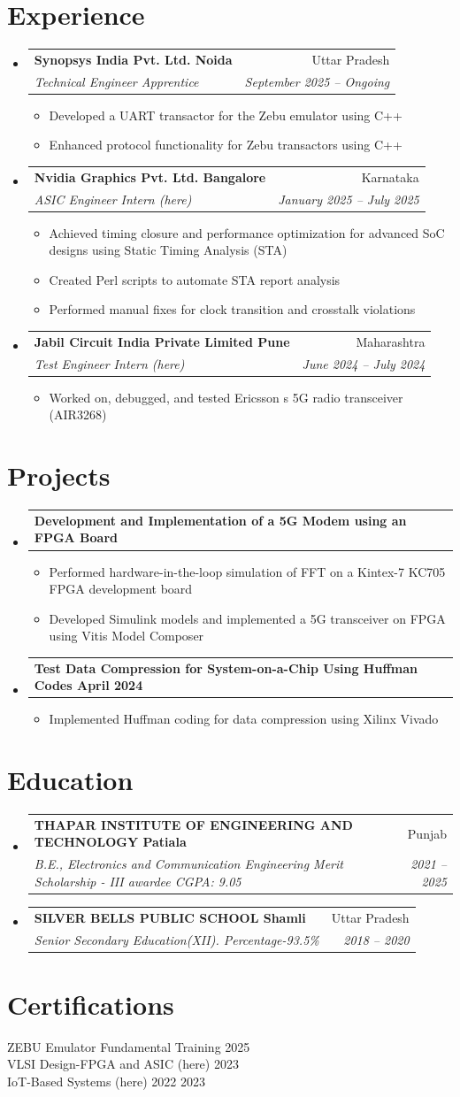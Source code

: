 \documentclass[letterpaper,11pt]{article}
\makeatletter
\newcommand{\resumeItem}[1]{\item\small{#1 \vspace{-2pt}}}
\newcommand{\resumeSubheading}[4]{
  \vspace{-2pt}\item
    \begin{tabular*}{\textwidth}[t]{l@{\extracolsep{\fill}}r}
      \textbf{#1} & #2 \\
      \textit{\small#3} & \textit{\small #4} \\
    \end{tabular*}\vspace{-7pt}
}
\newcommand{\resumeProjectHeading}[2]{
    \item
    \begin{tabular*}{\textwidth}{l@{\extracolsep{\fill}}r}
      \small#1 & #2 \\
    \end{tabular*}\vspace{-7pt}
}
\newcommand{\resumeSubHeadingListStart}{\begin{itemize}[leftmargin=0.15in, label={}]}
\newcommand{\resumeSubHeadingListEnd}{\end{itemize}}
\newcommand{\resumeItemListStart}{\begin{itemize}}
\newcommand{\resumeItemListEnd}{\end{itemize}\vspace{-5pt}}
\makeatother
\begin{document}
\section{Experience}
\resumeSubHeadingListStart
  \resumeSubheading
    { Synopsys India Pvt. Ltd. Noida }{ Uttar Pradesh }
    { Technical Engineer Apprentice }{ September 2025 -- Ongoing }
    \resumeItemListStart
      \resumeItem{ Developed a UART transactor for the Zebu emulator using C++ }
      \resumeItem{ Enhanced protocol functionality for Zebu transactors using C++ }
    \resumeItemListEnd
  \resumeSubheading
    { Nvidia Graphics Pvt. Ltd. Bangalore }{ Karnataka }
    { ASIC Engineer Intern (here) }{ January 2025 -- July 2025 }
    \resumeItemListStart
      \resumeItem{ Achieved timing closure and performance optimization for advanced SoC designs using Static Timing Analysis (STA) }
      \resumeItem{ Created Perl scripts to automate STA report analysis }
      \resumeItem{ Performed manual fixes for clock transition and crosstalk violations }
    \resumeItemListEnd
  \resumeSubheading
    { Jabil Circuit India Private Limited Pune }{ Maharashtra }
    { Test Engineer Intern (here) }{ June 2024 -- July 2024 }
    \resumeItemListStart
      \resumeItem{ Worked on, debugged, and tested Ericsson s 5G radio transceiver (AIR3268) }
    \resumeItemListEnd
\resumeSubHeadingListEnd

\section{Projects}
\resumeSubHeadingListStart
  \resumeProjectHeading
    {\textbf{ Development and Implementation of a 5G Modem using an FPGA Board }}{  }
    \resumeItemListStart
      \resumeItem{ Performed hardware-in-the-loop simulation of FFT on a Kintex-7 KC705 FPGA development board }
      \resumeItem{ Developed Simulink models and implemented a 5G transceiver on FPGA using Vitis Model Composer }
    \resumeItemListEnd
  \resumeProjectHeading
    {\textbf{ Test Data Compression for System-on-a-Chip Using Huffman Codes April 2024 }}{  }
    \resumeItemListStart
      \resumeItem{ Implemented Huffman coding for data compression using Xilinx Vivado }
    \resumeItemListEnd
\resumeSubHeadingListEnd

\section{Education}
\resumeSubHeadingListStart
  \resumeSubheading
    { THAPAR INSTITUTE OF ENGINEERING AND TECHNOLOGY Patiala }{ Punjab }
    { B.E., Electronics and Communication Engineering \textbar{} Merit Scholarship - III awardee \textbar{} CGPA: 9.05 }
    { 2021 -- 2025 }
  \resumeSubheading
    { SILVER BELLS PUBLIC SCHOOL Shamli }{ Uttar Pradesh }
    { Senior Secondary Education(XII). Percentage-93.5\% }
    { 2018 -- 2020 }
\resumeSubHeadingListEnd

\section{Certifications}
\begin{itemize}[leftmargin=0.15in, label={}]
  \small{\item{
    ZEBU Emulator Fundamental Training 2025 \\
    VLSI Design-FPGA and ASIC (here) 2023 \\
    IoT-Based Systems (here) 2022 2023 \\
  }}
\end{itemize}
\end{document}

